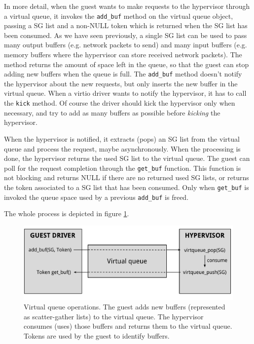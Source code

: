 \vspace{0.5cm}

In more detail, when the guest wants to make requests to the hypervisor through a virtual queue, it invokes the \texttt{add\_buf} method
on the virtual queue object, passing a SG list and a non-NULL token which is returned when the SG list has been consumed. As we have seen 
previously, a single SG list can be used to pass many output buffers (e.g. network packets to send) and many input buffers (e.g. memory 
buffers where the hypervisor can store received network packets). The method returns the amount of space left in the queue, so that 
the guest can stop adding new buffers when the queue is full.
The \texttt{add\_buf} method doesn't notify the hypervisor about the new requests, but only inserts the new buffer in the virtual queue.
When a virtio driver wants to notify the hypervisor, it has to call the \texttt{kick} method. Of course
the driver should kick the hypervisor only when necessary, and try to add as many buffers as possible before \emph{kicking} the hypervisor.

When the hypervisor is notified, it extracts (pops) an SG list from the virtual queue and process the request, maybe asynchronously.
When the processing is done, the hypervisor returns the used SG list to the virtual queue.
The guest can poll for the request completion through the \texttt{get\_buf} function. This function is not blocking and returns NULL if 
there are no returned used SG lists, or returns the token associated to a SG list that has been consumed. Only when
\texttt{get\_buf} is invoked the queue space used by a previous \texttt{add\_buf} is freed.

The whole process is depicted in figure \ref{fig:virtqueue}.

\begin{figure}[bt]
\centering
\includegraphics[scale = 0.48]{virtqueue.pdf}
\caption{Virtual queue operations. The guest adds new buffers (represented as scatter-gather lists) to the virtual queue. The hypervisor
	consumes (uses) those buffers and returns them to the virtual queue. Tokens are used by the guest to identify buffers.}
\label{fig:virtqueue}
\end{figure}

